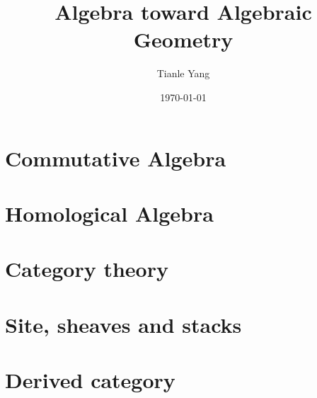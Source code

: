 \documentclass[sectionlevel=book]{noteformyself}
\title{Algebra toward Algebraic Geometry}
\author{Tianle Yang}
\date{\today}
\begin{document}
    \maketitle

    \tableofcontents %

    \chapter{Commutative Algebra}
        
        
        
        
        
        
        

    \chapter{Homological Algebra}
        
        
        

    \chapter{Category theory}
        
        
        

    \chapter{Site, sheaves and stacks}
        

    \chapter{Derived category}
        




    \printbibliography[heading=bibintoc, title={References}] %
\end{document}
